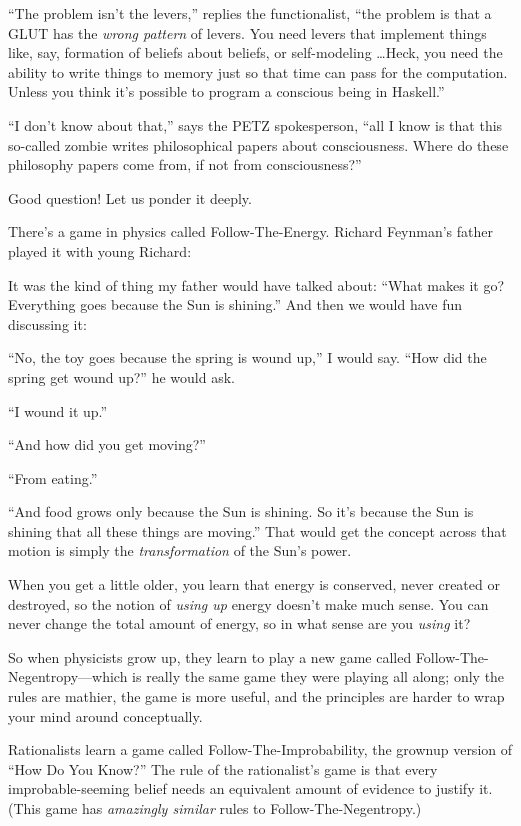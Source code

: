 {
 ``The problem isn't the
levers,'' replies the functionalist,
``the problem is that a GLUT has the \textit{wrong
pattern} of levers. You need levers that implement things like, say,
formation of beliefs about beliefs, or self-modeling \ldots Heck, you
need the ability to write things to memory just so that time can pass
for the computation. Unless you think it's possible to
program a conscious being in Haskell.''}

{
 ``I don't know about
that,'' says the PETZ spokesperson,
``all I know is that this so-called zombie writes
philosophical papers about consciousness. Where do these philosophy
papers come from, if not from consciousness?''}

{
 Good question! Let us ponder it deeply.}

{
 There's a game in physics called
Follow-The-Energy. Richard Feynman's father played it
with young Richard:}

{
 It was the kind of thing my father would have talked about:
``What makes it go? Everything goes because the Sun is
shining.'' And then we would have fun discussing it:}

{
 ``No, the toy goes because the spring is wound
up,'' I would say. ``How did the
spring get wound up?'' he would ask.}

{
 ``I wound it up.''}

{
 ``And how did you get
moving?''}

{
 ``From eating.''}

{
 ``And food grows only because the Sun is shining.
So it's because the Sun is shining that all these
things are moving.'' That would get the concept
across that motion is simply the \textit{transformation} of the
Sun's power.}

{
 When you get a little older, you learn that energy is conserved,
never created or destroyed, so the notion of \textit{using up} energy
doesn't make much sense. You can never change the total
amount of energy, so in what sense are you \textit{using} it?}

{
 So when physicists grow up, they learn to play a new game called
Follow-The-Negentropy---which is really the same game they were playing
all along; only the rules are mathier, the game is more useful, and the
principles are harder to wrap your mind around conceptually.}

{
 Rationalists learn a game called Follow-The-Improbability, the
grownup version of ``How Do You
Know?'' The rule of the rationalist's
game is that every improbable-seeming belief needs an equivalent amount
of evidence to justify it. (This game has \textit{amazingly similar}
rules to Follow-The-Negentropy.)}

